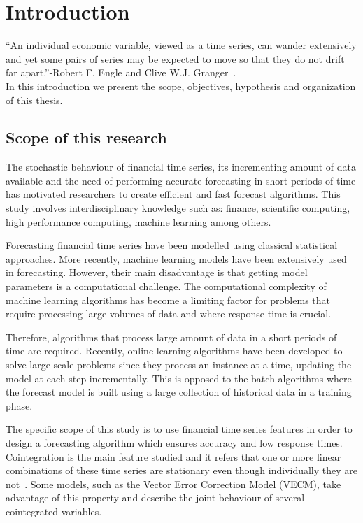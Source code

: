 \chapter{Introduction}\label{ch:introduction}

\vspace{0.5cm} 

``An individual economic variable, viewed as a time series, can wander extensively
and yet some pairs of series may be expected to move so that they do not drift
far apart.''-Robert F. Engle and Clive W.J. Granger~\cite{engle1987}.\\
In this introduction we present the scope, objectives, hypothesis and
organization of this thesis.


\section{Scope of this research}

The stochastic behaviour of financial time series, its incrementing
amount of data available and the need of performing accurate forecasting in
short periods of time has motivated researchers to create efficient and fast forecast
algorithms. This study involves interdisciplinary knowledge such as: finance,
scientific computing, high performance computing, machine learning
among others.

Forecasting financial time series have been modelled using classical statistical
approaches. More recently, machine learning models have been extensively used in
forecasting. However, their main disadvantage is that getting model parameters
is a computational challenge.  The computational complexity of machine learning
algorithms has become a limiting factor for problems that require processing
large volumes of data and where response time is crucial.

Therefore, algorithms that process large amount of data in a short periods of
time are required. Recently, online learning algorithms have been developed to solve
large-scale problems since they process an instance at a time, updating the
model at each step incrementally. This is opposed to the batch algorithms where
the forecast model is built using a large collection of historical data in
a training phase.

The specific scope of this study is to use financial time series features in
order to design a forecasting algorithm which ensures accuracy and low response
times. Cointegration is the main feature studied and it refers that one or more
linear combinations of these time series are stationary even though individually
they are not~\cite{engle87}.  Some models, such as the Vector Error Correction Model
(VECM), take advantage of this property and describe the joint behaviour of
several cointegrated variables.

